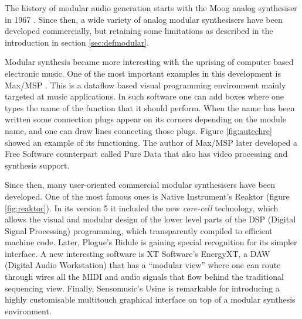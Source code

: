The history of modular audio generation starts with the Moog
analog synthesiser in 1967 \cite{moog1964voltage}. Since then, a wide
variety of analog modular synthesisers have been developed
commercially, but retaining some limitations as described in the
introduction in section \ref{sec:defmodular}.

Modular synthesis became more interesting with the uprising of
computer based electronic music. One of the most important examples in
this development is Max/MSP \cite{puckete2002max}. This is a dataflow
based visual programming environment mainly targeted at music
applications. In such software one can add boxes where one types the
name of the function that it should perform. When the name has been
written some connection plugs appear on its corners depending on the
module name, and one can draw lines connecting those plugs. Figure
\ref{fig:autechre} showed an example of its functioning. The author of
Max/MSP later developed a Free Software counterpart called Pure
Data\cite{puckette96puredata} that also has video processing
and synthesis support.


Since then, many user-oriented commercial modular synthesisers have
been developed. One of the most famous ones is Native Instrument's
Reaktor (figure \ref{fig:reaktor}). In its version 5 it included the
new \emph{core-cell} technology, which allows the visual and modular
design of the lower level parts of the DSP (Digital Signal
Processing) programming, which transparently compiled to efficient
machine code. Later, Plogue's Bidule is gaining special recognition
for its simpler interface. A new interesting software is XT Software's
EnergyXT, a DAW (Digital Audio Workstation) that has a ``modular
view'' where one can route through wires all the MIDI and audio
signals that flow behind the traditional sequencing view. Finally,
Sensomusic's Usine is remarkable for introducing a highly customisable
multitouch graphical interface on top of a modular synthesis
environment.

